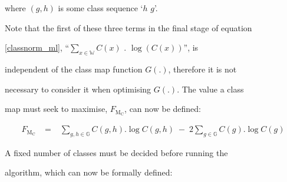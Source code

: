 where $(g,h)$ is some class sequence `$h$ $g$'.





Note that the first of these three terms in the final stage of equation


\ref{classnorm_ml}, ``$\sum_{x \in \mathbb{W}} C(x)$ $.$ $\log(C(x))$'', is


independent of the class map function $G(.)$, therefore it is not


necessary to consider it when optimising $G(.)$.  The value a class


map must seek to maximise, $F_{\mathrm{M}_\mathrm{C}}$, can now be defined:


\begin{eqnarray}


F_{\mathrm{M}_\mathrm{C}}


&\;=\;&


 \sum_{g,h \in \mathbb{G}} C(g,h) . \log C(g,h)


\;-\; 2 \sum_{g \in \mathbb{G}} C(g) . \log C(g)\label{classnorm_Fml}


\end{eqnarray}





A fixed number of classes must be decided before running the


algorithm, which can now be formally defined:





